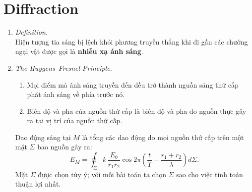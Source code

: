 \section{Diffraction}
\begin{enumerate}
\item \textit{Definition.}\\
Hiện tượng tia sáng bị lệch khỏi phương truyền thẳng khi đi gần các chướng ngại vật được gọi là \textbf{nhiễu xạ ánh sáng}.

\item \textit{The Huygens--Fresnel Principle.}\\
\begin{enumerate}
  \item[(a)] Mọi điểm mà ánh sáng truyền đến đều trở thành nguồn sáng thứ cấp phát ánh sáng về phía trước nó.
  \item[(b)] Biên độ và pha của nguồn thứ cấp là biên độ và pha do nguồn thực gây ra tại vị trí của nguồn thứ cấp.
\end{enumerate}
Dao động sáng tại $M$ là tổng các dao động do mọi nguồn thứ cấp trên một mặt $\Sigma$ bao nguồn gây ra:
\[
E_M = \oint_\Sigma k\,\frac{E_0}{r_1 r_2}\cos 2\pi\left(\frac{t}{T} - \frac{r_1 + r_2}{\lambda}\right)d\Sigma.
\]
Mặt $\Sigma$ được chọn tùy ý; với mỗi bài toán ta chọn $\Sigma$ sao cho việc tính toán thuận lợi nhất.


\end{enumerate}

